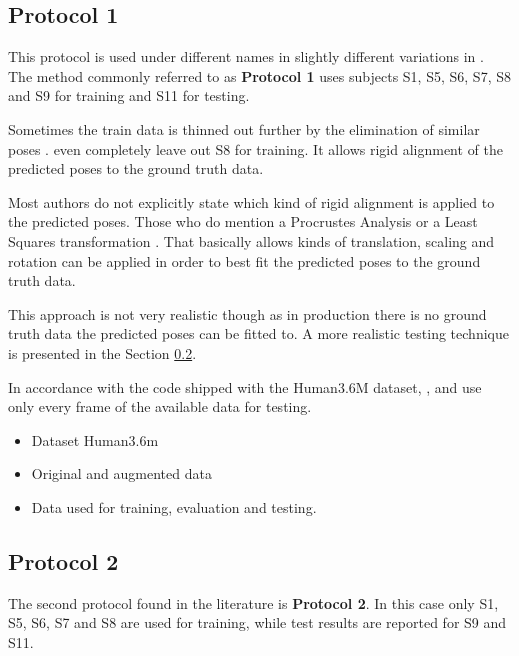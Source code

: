 \subsection{Protocol 1}

This protocol is used under different names in slightly different variations in \cite{sun17, drover18, moreno-noguer16, yasin16, kostrikov14, tome17}.
The method commonly referred to as \textbf{Protocol 1} uses subjects S1, S5, S6, S7, S8 and S9 for training and S11 for testing.

Sometimes the train data is thinned out further by the elimination of similar poses \cite{yasin16}.
\citet{drover18} even completely leave out S8 for training.
It allows rigid alignment \cite{drover18, yasin16, kostrikov14, sun17, tome17, chen17} of the predicted poses to the ground truth data.


Most authors do not explicitly state which kind of rigid alignment is applied to the predicted poses.
Those who do mention a Procrustes Analysis \cite{sun17, tome17} or a Least Squares transformation \cite{kostrikov14}.
That basically allows kinds of translation, scaling and rotation can be applied in order to best fit the predicted poses to the ground truth data.

This approach is not very realistic though as in production there is no ground truth data the predicted poses can be fitted to.
A more realistic testing technique is presented in the Section \ref{sec:protocol2}.

In accordance with the code shipped with the Human3.6M dataset, \citet{sun17}, \citet{chen17} and \citet{moreno-noguer16} use only every  frame of the available data for testing.



%
\begin{itemize}
	\item Dataset Human3.6m
	\item Original and augmented data
	\item Data used for training, evaluation and testing.
\end{itemize}
\subsection{Protocol 2}\label{sec:protocol2}

The second protocol found in the literature is \textbf{Protocol 2}.
In this case only S1, S5, S6, S7 and S8 are used for training, while test results are reported for S9 and S11.

